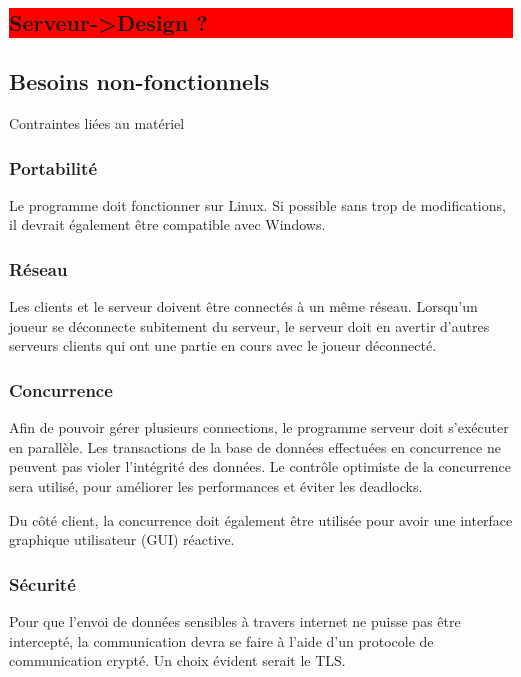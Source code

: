 \documentclass[french, utf8]{article}
\begin{document}
\colorbox{red}{\subsection{Serveur->Design ?}
\label{sec:Server}}



\subsection{Besoins non-fonctionnels}
Contraintes liées au matériel

\subsubsection{Portabilité}

Le programme doit fonctionner sur Linux. Si possible sans trop de modifications, il devrait également être compatible avec Windows.

\subsubsection{Réseau}

Les clients et le serveur doivent être connectés à un même réseau. Lorsqu'un joueur se déconnecte subitement du serveur, le serveur doit en avertir d'autres serveurs clients qui ont une partie en cours avec le joueur déconnecté.

\subsubsection{Concurrence}

Afin de pouvoir gérer plusieurs connections, le programme serveur doit s'exécuter en parallèle. Les transactions de la base de données effectuées en concurrence ne peuvent pas violer l'intégrité des données. Le contrôle optimiste de la concurrence sera utilisé, pour améliorer les performances et éviter les deadlocks.

Du côté client, la concurrence doit également être utilisée pour avoir une interface graphique utilisateur (GUI) réactive.

\subsubsection{Sécurité}

Pour que l'envoi de données sensibles à travers internet ne puisse pas être intercepté, la communication devra se faire à l'aide d'un protocole de communication crypté. Un choix évident serait le \acrfull{TLS}.
\end{document}
